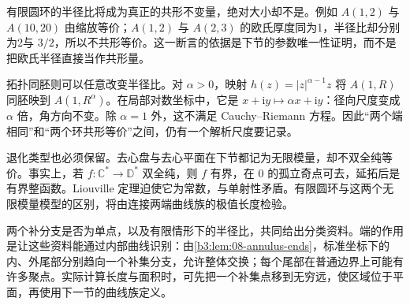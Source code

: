 有限圆环的半径比将成为真正的共形不变量，绝对大小却不是。例如 \(A(1,2)\) 与 \(A(10,20)\) 由缩放等价；\(A(1,2)\) 与 \(A(2,3)\) 的欧氏厚度同为1，半径比却分别为2与 \(3/2\)，所以不共形等价。这一断言的依据是下节的参数唯一性证明，而不是把欧氏半径直接当作共形量。

\ProseParagraphBreak
拓扑同胚则可以任意改变半径比。对 \(\alpha>0\)，映射 \(h(z)=|z|^{\alpha-1}z\) 将 \(A(1,R)\) 同胚映到 \(A(1,R^\alpha)\)。在局部对数坐标中，它是 \(x+\mathrm i y\mapsto\alpha x+\mathrm i y\)：径向尺度变成 \(\alpha\) 倍，角方向不变。除 \(\alpha=1\) 外，这不满足 Cauchy--Riemann 方程。因此“两个端相同”和“两个环共形等价”之间，仍有一个解析尺度要记录。

\ProseParagraphBreak
退化类型也必须保留。去心盘与去心平面在下节都记为无限模量，却不双全纯等价。事实上，若 \(f:\mathbb C^*\to\mathbb D^*\) 双全纯，则 \(f\) 有界，在 \(0\) 的孤立奇点可去，延拓后是有界整函数。Liouville 定理迫使它为常数，与单射性矛盾。有限圆环与这两个无限模量模型的区别，将由连接两端曲线族的极值长度检验。

\ProseParagraphBreak
两个补分支是否为单点，以及有限情形下的半径比，共同给出分类资料。端的作用是让这些资料能通过内部曲线识别：由\cref{b3:lem:08-annulus-ends}，标准坐标下的内、外尾部分别趋向一个补集分支，允许整体交换；每个尾部在普通边界上可能有许多聚点。实际计算长度与面积时，可先把一个补集点移到无穷远，使区域位于平面，再使用下一节的曲线族定义。
